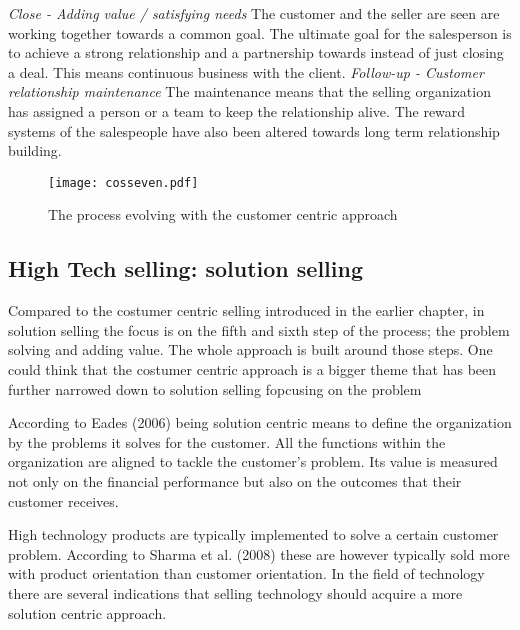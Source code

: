 \documentclass[12pt,a4paper,oneside,pdftex]{report}
\begin{document}
\emph{Close - Adding value / satisfying needs}\newline
The customer and the seller are seen are working together towards a common goal. The ultimate goal for the salesperson is to achieve a strong relationship and a partnership towards instead of just closing a deal. This means continuous business with the client. \citep{Moncrief} \newline \newline
\emph{Follow-up - Customer relationship maintenance}\newline
The maintenance means that the selling organization has assigned a person or a team to keep the relationship alive. The reward systems of the salespeople have also been altered towards long term relationship building.  \citep{Moncrief}
\begin{figure}[ht]
  \begin{center}
    \texttt{[image: cosseven.pdf]}
    \caption{The process evolving with the customer centric approach}
    \label{fig:cosseven}
  \end{center}
\end{figure}

\subsection{High Tech selling: solution selling}


Compared to the costumer centric selling introduced in the earlier chapter, in solution selling  the focus is on the fifth and sixth step of the process; the problem solving and adding value. The whole approach is built around those steps. One could think that the costumer centric approach is a bigger theme that has been further narrowed down to solution selling fopcusing on the problem

According to Eades (2006) being solution centric means to define the organization by the problems it solves for the customer. All the functions within the organization are aligned to tackle the customer's problem. Its value is measured not only on the financial performance but also on the outcomes that their customer receives. 

High technology products are typically implemented to solve a certain customer problem. According to Sharma et al. (2008) these are however typically sold more with product orientation than  customer orientation. In the field of technology there are several indications that selling technology should acquire a more solution centric approach.
\end{document}

